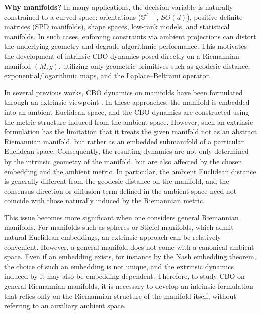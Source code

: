 \documentclass[11pt]{amsart}
\begin{document}
\noindent\textbf{Why manifolds?}
In many applications, the decision variable is naturally constrained to a curved space: orientations ($\mathbb{S}^{d-1}$, $SO(d)$), positive definite matrices (SPD manifolds), shape spaces, low-rank models, and statistical manifolds. In such cases, enforcing constraints via ambient projections can distort the underlying geometry and degrade algorithmic performance. This motivates the development of intrinsic CBO dynamics posed directly on a Riemannian manifold $(M,g)$, utilizing only geometric primitives such as geodesic distance, exponential/logarithmic maps, and the Laplace--Beltrami operator. 

In several previous works, CBO dynamics on manifolds have been formulated through an extrinsic viewpoint 
\cite{carrillo2405interacting,fornasier2020consensus,fornasier2024consensus,ha2022stochastic}. In these approaches, the manifold is embedded into an ambient Euclidean space, and the CBO dynamics are constructed using the metric structure induced from the ambient space. However, such an extrinsic formulation has the limitation that it treats the given manifold not as an abstract Riemannian manifold, but rather as an embedded submanifold of a particular Euclidean space. Consequently, the resulting dynamics are not only determined by the intrinsic geometry of the manifold, but are also affected by the chosen embedding and the ambient metric. In particular, the ambient Euclidean distance is generally different from the geodesic distance on the manifold, and the consensus direction or diffusion term defined in the ambient space need not coincide with those naturally induced by the Riemannian metric.

This issue becomes more significant when one considers general Riemannian manifolds. For manifolds such as spheres or Stiefel manifolds, which admit natural Euclidean embeddings, an extrinsic approach can be relatively convenient. However, a general manifold does not come with a canonical ambient space. Even if an embedding exists, for instance by the Nash embedding theorem, the choice of such an embedding is not unique, and the extrinsic dynamics induced by it may also be embedding-dependent. Therefore, to study CBO on general Riemannian manifolds, it is necessary to develop an intrinsic formulation that relies only on the Riemannian structure of the manifold itself, without referring to an auxiliary ambient space.
\end{document}
